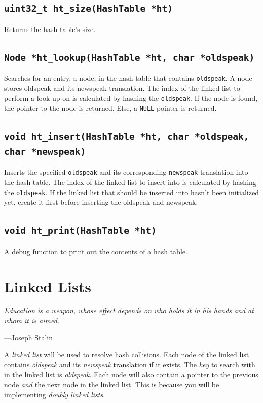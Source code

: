 \documentclass{article}
\begin{document}
\subsection{\texttt{uint32\_t ht\_size(HashTable *ht)}}

Returns the hash table's size.

\subsection{\texttt{Node *ht\_lookup(HashTable *ht, char *oldspeak)}}

Searches for an entry, a node, in the hash table that contains
\texttt{oldspeak}. A node stores oldspeak and its newspeak translation.
The index of the linked list to perform a look-up on is calculated by
hashing the \texttt{oldspeak}. If the node is found, the pointer to the
node is returned. Else, a \texttt{NULL} pointer is returned.

\subsection{\texttt{void ht\_insert(HashTable *ht, char *oldspeak,
char *newspeak)}}

Inserts the specified \texttt{oldspeak} and its corresponding
\texttt{newspeak} translation into the hash table. The index of the
linked list to insert into is calculated by hashing the
\texttt{oldspeak}. If the linked list that should be inserted into
hasn't been initialized yet, create it first before inserting the
oldspeak and newspeak.

\subsection{\texttt{void ht\_print(HashTable *ht)}}

A debug function to print out the contents of a hash table.

\section{Linked Lists}

\epigraph{\emph{Education is a weapon, whose effect depends on who holds
it in his hands and at whom it is aimed.}}{---Joseph Stalin}

\noindent A \emph{linked list} will be used to resolve hash collisions.
Each node of the linked list contains \emph{oldspeak} and its
\emph{newspeak} translation if it exists. The \emph{key} to search with
in the linked list is \emph{oldspeak}. Each node will also contain a
pointer to the previous node \emph{and} the next node in the linked
list. This is because you will be implementing \emph{doubly linked
lists}.
\end{document}
